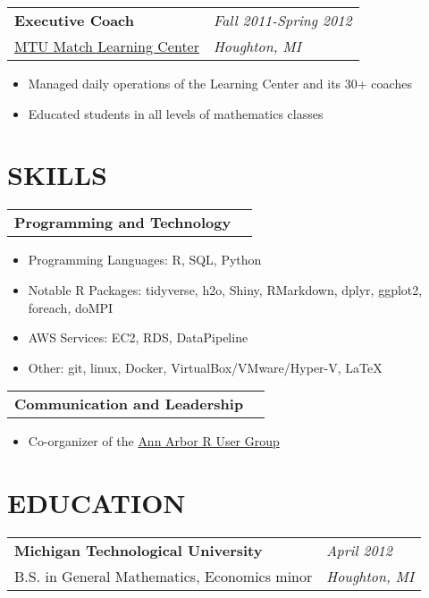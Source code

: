 \documentclass[margin,line]{res}
\begin{document}
\begin{resume}
\begin{tabular}{p{4.4in} l}
  {\bf Executive Coach} &  \emph{Fall 2011-Spring 2012}\\
  \href{http://www.mathlab.mtu.edu/mlc/index.php/Main_Page}{MTU Match Learning Center} & \emph{Houghton, MI}
\end{tabular}
\vspace{1pt}
\begin{itemize}\itemsep -2pt %
  \item Managed daily operations of the Learning Center and its 30+ coaches
  \item Educated students in all levels of mathematics classes
\end{itemize}

\vspace{3pt}


\section{SKILLS}

\begin{tabular}{p{4.4in} l}
  {\bf Programming and Technology}
\end{tabular}
\vspace{2pt}
\begin{itemize} \itemsep -2pt
  \item Programming Languages: R, SQL, Python
  \item Notable R Packages: tidyverse, h2o, Shiny, RMarkdown, dplyr, ggplot2, foreach, doMPI
  \item AWS Services: EC2, RDS, DataPipeline
  \item Other: git, linux, Docker, VirtualBox/VMware/Hyper-V, \LaTeX
\end{itemize}

\begin{tabular}{p{4.4in} l}
  {\bf Communication and Leadership}
\end{tabular}
\vspace{2pt}
\begin{itemize} \itemsep -2pt
  \item Co-organizer of the \href{https://annarborrusergroup.github.io/}{Ann Arbor R User Group}
\end{itemize}

\vspace{3pt}


\section{EDUCATION}

\begin{tabular}{p{4.4in} l}
  {\bf Michigan Technological University} & \emph{April 2012} \\
  B.S. in General Mathematics, Economics minor & \emph{Houghton, MI} \\
\end{tabular}


\end{resume}
\end{document}
